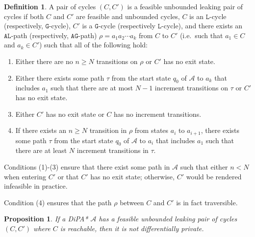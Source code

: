 \documentclass[12pt]{article}
\newtheorem{prop}[thm]{Proposition}
\theoremstyle{definition}
\newtheorem{defn}[thm]{Definition}
\begin{document}
\begin{defn}
	A pair of cycles $(C, C')$ is a feasible unbounded leaking pair of cycles if both $C$ and $C'$ are feasible and unbounded cycles, $C$ is an $\texttt{L}$-cycle (respectively, $\texttt{G}$-cycle), $C'$ is a $\texttt{G}$-cycle (respectively $\texttt{L}$-cycle), and there exists an $\texttt{AL}$-path (respectively, $\texttt{AG}$-path) $\rho = a_1 a_2\cdots a_k$ from $C$ to $C'$ (i.e.\ such that $a_1\in C$ and $a_k \in C'$) such that all of the following hold:
	\begin{enumerate}
		\item Either there are no $n \geq N$ transitions on $\rho$ or $C'$ has no exit state.
		\item Either there exists some path $\tau$ from the start state $q_0$ of $\mathcal{A}$ to $a_k$ that includes $a_1$ such that there are at most $N-1$ increment transitions on $\tau$ or $C'$ has no exit state.
		\item Either $C'$ has no exit state or $C$ has no increment transitions.
		\item If there exists an $n\geq N$ transition in $\rho$ from states $a_i$ to $a_{i+1}$, there exists some path $\tau$ from the start state $q_0$ of $\mathcal{A}$ to $a_i$ that includes $a_1$ such that there are at least $N$ increment transitions in $\tau$.
	\end{enumerate}

	Conditions (1)-(3) ensure that there exist some path in $\mathcal{A}$ such that either $n < N$ when entering $C'$ or that $C'$ has no exit state; otherwise, $C'$ would be rendered infeasible in practice.
	
	Condition (4) ensures that the path $\rho$ between $C$ and $C'$ is in fact traversible. 

	
\end{defn}

\begin{prop}
	If a DiPA* $\mathcal{A}$ has a feasible unbounded leaking pair of cycles $(C, C')$ where $C$ is reachable, then it is not differentially private.
\end{prop}
\end{document}
